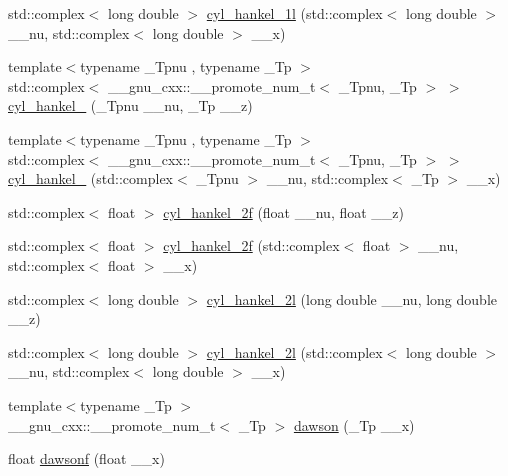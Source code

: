 \begin{DoxyCompactItemize}
std\+::complex$<$ long double $>$ \hyperlink{namespace____gnu__cxx_a6900f79ec70673bcb001538aec74e07c}{cyl\+\_\+hankel\+\_\+1l} (std\+::complex$<$ long double $>$ \+\_\+\+\_\+nu, std\+::complex$<$ long double $>$ \+\_\+\+\_\+x)
\item 
{\footnotesize template$<$typename \+\_\+\+Tpnu , typename \+\_\+\+Tp $>$ }\\std\+::complex$<$ \+\_\+\+\_\+gnu\+\_\+cxx\+::\+\_\+\+\_\+promote\+\_\+num\+\_\+t$<$ \+\_\+\+Tpnu, \+\_\+\+Tp $>$ $>$ \hyperlink{namespace____gnu__cxx_a307fd77aa8f0ed2028a9fab88976ca54}{cyl\+\_\+hankel\+\_} (\+\_\+\+Tpnu \+\_\+\+\_\+nu, \+\_\+\+Tp \+\_\+\+\_\+z)
\item 
{\footnotesize template$<$typename \+\_\+\+Tpnu , typename \+\_\+\+Tp $>$ }\\std\+::complex$<$ \+\_\+\+\_\+gnu\+\_\+cxx\+::\+\_\+\+\_\+promote\+\_\+num\+\_\+t$<$ \+\_\+\+Tpnu, \+\_\+\+Tp $>$ $>$ \hyperlink{namespace____gnu__cxx_afb943392dd7cee0114fca8d36cb1318e}{cyl\+\_\+hankel\+\_} (std\+::complex$<$ \+\_\+\+Tpnu $>$ \+\_\+\+\_\+nu, std\+::complex$<$ \+\_\+\+Tp $>$ \+\_\+\+\_\+x)
\item 
std\+::complex$<$ float $>$ \hyperlink{namespace____gnu__cxx_a2b75361870975c47d57bed71b4064ce7}{cyl\+\_\+hankel\+\_\+2f} (float \+\_\+\+\_\+nu, float \+\_\+\+\_\+z)
\item 
std\+::complex$<$ float $>$ \hyperlink{namespace____gnu__cxx_ae21f9d09b937eaf9729982da5a382f20}{cyl\+\_\+hankel\+\_\+2f} (std\+::complex$<$ float $>$ \+\_\+\+\_\+nu, std\+::complex$<$ float $>$ \+\_\+\+\_\+x)
\item 
std\+::complex$<$ long double $>$ \hyperlink{namespace____gnu__cxx_a4babb91ca6906f237e8bd1f0f1a10509}{cyl\+\_\+hankel\+\_\+2l} (long double \+\_\+\+\_\+nu, long double \+\_\+\+\_\+z)
\item 
std\+::complex$<$ long double $>$ \hyperlink{namespace____gnu__cxx_a1ac6434925254bd02e108f5a4e52b34d}{cyl\+\_\+hankel\+\_\+2l} (std\+::complex$<$ long double $>$ \+\_\+\+\_\+nu, std\+::complex$<$ long double $>$ \+\_\+\+\_\+x)
\item 
{\footnotesize template$<$typename \+\_\+\+Tp $>$ }\\\+\_\+\+\_\+gnu\+\_\+cxx\+::\+\_\+\+\_\+promote\+\_\+num\+\_\+t$<$ \+\_\+\+Tp $>$ \hyperlink{namespace____gnu__cxx_a30e46cb24428cfdb858c52fec431dee4}{dawson} (\+\_\+\+Tp \+\_\+\+\_\+x)
\item 
float \hyperlink{namespace____gnu__cxx_a0a1b8e6760b8c7869127d41d96209318}{dawsonf} (float \+\_\+\+\_\+x)
\item 

\end{DoxyCompactItemize}
